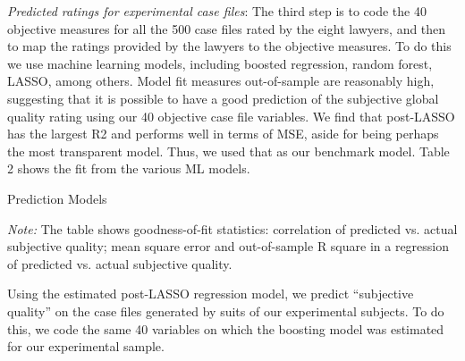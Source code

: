 \documentclass[12 pt]{article}
\newenvironment{figurenotes}[1][\footnotesize{Note}]{\begin{minipage}[t]{\linewidth}\footnotesize{\itshape#1: }}{\end{minipage}}
\begin{document}
\emph{Predicted ratings for experimental case files}: The third step is to code the 40 objective measures for all the 500 case files rated by the eight lawyers, and then to map the ratings provided by the lawyers to the objective measures. To do this we use machine learning models, including boosted regression, random forest, LASSO, among others. Model fit measures out-of-sample are reasonably high, suggesting that it is possible to have a good prediction of the subjective global quality rating using our 40 objective case file variables. We find that post-LASSO has the largest R2 and performs well in terms of MSE, aside for being perhaps the most transparent model. Thus, we used that as our benchmark model. Table 2 shows the fit from the various ML models. 
\\

\begin{table}[!ht]
    \caption{Prediction Models}
    \label{tab:2_pred}
    \center
    \notesize{}
    \begin{figurenotes}
    The table shows goodness-of-fit statistics: correlation of predicted vs. actual subjective quality; mean square error and out-of-sample R square in a regression of predicted vs. actual subjective quality.
    \end{figurenotes}
  
\end{table}



Using the estimated post-LASSO regression model, we predict “subjective quality” on the case files generated by suits of our experimental subjects. To do this, we code the same 40 variables on which the boosting model was estimated for our experimental sample. 
\end{document}
